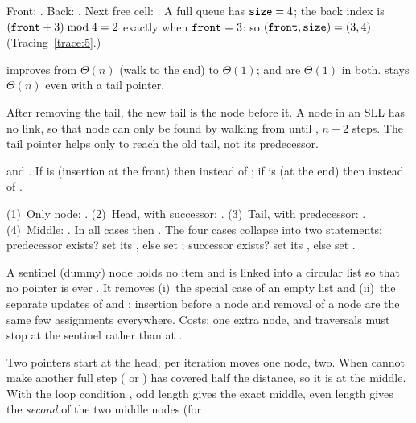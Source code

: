 \begin{questions}
\item Front: . Back: . Next free
  cell: . A full queue has $\texttt{size}=4$; the back index is
  $(\texttt{front}+3)\bmod4=2$ exactly when $\texttt{front}=3$: so
  $(\texttt{front},\texttt{size})=(3,4)$. (Tracing~\ref{trace:5}.)
\item {} improves from $\Theta(n)$ (walk to the end) to $\Theta(1)$;
   and  are $\Theta(1)$ in both.  stays
  $\Theta(n)$ even with a tail pointer.
\item After removing the tail, the new tail is the node before it. A node in an SLL has no
   link, so that node can only be found by walking from  until
  , $n-2$ steps. The tail pointer helps only to reach the old tail,
  not its predecessor.
\item {} and . If  is
   (insertion at the front) then  instead of ; if
   is  (at the end) then  instead of .
\item (1)~Only node: . (2)~Head, with successor:
  . (3)~Tail, with predecessor:
  . (4)~Middle:
  . In all cases then
  . The four cases collapse into two  statements:
  predecessor exists? set its , else set ; successor exists? set its
  , else set .
\item A sentinel (dummy) node holds no item and is linked into a circular list so that no
  pointer is ever . It removes (i)~the special case of an empty list and
  (ii)~the separate updates of  and : insertion before a node and
  removal of a node are the same few assignments everywhere. Costs: one extra node, and
  traversals must stop at the sentinel rather than at .
\item Two pointers start at the head; per iteration  moves one node, 
  two. When  cannot make another full step ( or
  )  has covered half the distance, so it is at the
  middle. With the loop condition , odd length gives
  the exact middle, even length gives the \emph{second} of the two middle nodes (for

\end{questions}
